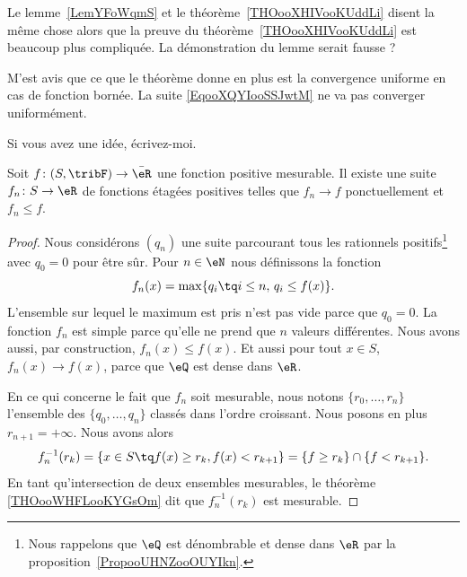 \begin{probleme}
	Le lemme~\ref{LemYFoWqmS} et le théorème~\ref{THOooXHIVooKUddLi} disent la même chose alors que la preuve du théorème~\ref{THOooXHIVooKUddLi} est beaucoup plus compliquée. La démonstration du lemme serait fausse ?

	M'est avis que ce que le théorème donne en plus est la convergence uniforme en cas de fonction bornée. La suite \eqref{EqooXQYIooSSJwtM} ne va pas converger uniformément.

	Si vous avez une idée, écrivez-moi.

\end{probleme}

\begin{lemma}    \label{LemYFoWqmS}
	Soit \( f\colon (S,\tribF)\to \bar\eR\) une fonction positive mesurable. Il existe une suite \( f_n\colon S\to \eR\) de fonctions étagées positives telles que \( f_n\to f\) ponctuellement et \( f_n \leq f\).
\end{lemma}

\begin{proof}
	Nous considérons \( (q_n)\) une suite parcourant tous les rationnels positifs\footnote{Nous rappelons que \( \eQ\) est dénombrable et dense dans \( \eR\) par la proposition~\ref{PropooUHNZooOUYIkn}.} avec \( q_0=0\) pour être sûr.
	Pour \( n\in \eN\) nous définissons la fonction
	\begin{equation}        \label{EqooXQYIooSSJwtM}
		f_n(x)= \max\{ q_i\tq i\leq n,\, q_i\leq f(x) \}.
	\end{equation}
	L'ensemble sur lequel le maximum est pris n'est pas vide parce que \( q_0=0\). La fonction \( f_n\) est simple parce qu'elle ne prend que \( n\) valeurs différentes. Nous avons aussi, par construction, \(  f_n(x)\leq f(x) \). Et aussi pour tout \( x\in S\), \( f_n(x)\to f(x)\), parce que \( \eQ\) est dense dans \( \eR\).

	En ce qui concerne le fait que \( f_n\) soit mesurable, nous notons \( \{ r_0,\ldots, r_{n} \}\) l'ensemble des \( \{ q_0,\ldots, q_n \}\) classés dans l'ordre croissant. Nous posons en plus \( r_{n+1}=+\infty\). Nous avons alors
	\begin{equation}
		f_n^{-1}(r_k)=\{ x\in S\tq f(x)\geq r_k,f(x)<r_{k+1} \}=\{ f\geq r_k \}\cap\{ f<r_{k+1} \}.
	\end{equation}
	En tant qu'intersection de deux ensembles mesurables, le théorème \ref{THOooWHFLooKYGsOm} dit que \( f_n^{-1}(r_k)\) est mesurable.
\end{proof}

